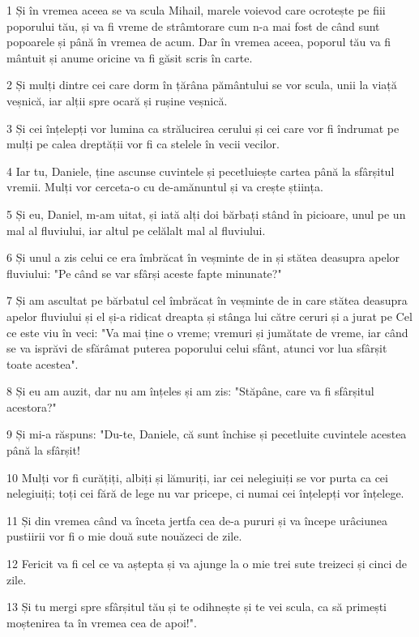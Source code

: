 \par 1 Și în vremea aceea se va scula Mihail, marele voievod care ocrotește pe fiii poporului tău, și va fi vreme de strâmtorare cum n-a mai fost de când sunt popoarele și până în vremea de acum. Dar în vremea aceea, poporul tău va fi mântuit și anume oricine va fi găsit scris în carte.
\par 2 Și mulți dintre cei care dorm în țărâna pământului se vor scula, unii la viață veșnică, iar alții spre ocară și rușine veșnică.
\par 3 Și cei înțelepți vor lumina ca strălucirea cerului și cei care vor fi îndrumat pe mulți pe calea dreptății vor fi ca stelele în vecii vecilor.
\par 4 Iar tu, Daniele, ține ascunse cuvintele și pecetluiește cartea până la sfârșitul vremii. Mulți vor cerceta-o cu de-amănuntul și va crește știința.
\par 5 Și eu, Daniel, m-am uitat, și iată alți doi bărbați stând în picioare, unul pe un mal al fluviului, iar altul pe celălalt mal al fluviului.
\par 6 Și unul a zis celui ce era îmbrăcat în veșminte de in și stătea deasupra apelor fluviului: "Pe când se var sfârși aceste fapte minunate?"
\par 7 Și am ascultat pe bărbatul cel îmbrăcat în veșminte de in care stătea deasupra apelor fluviului și el și-a ridicat dreapta și stânga lui către ceruri și a jurat pe Cel ce este viu în veci: "Va mai ține o vreme; vremuri și jumătate de vreme, iar când se va isprăvi de sfărâmat puterea poporului celui sfânt, atunci vor lua sfârșit toate acestea".
\par 8 Și eu am auzit, dar nu am înțeles și am zis: "Stăpâne, care va fi sfârșitul acestora?"
\par 9 Și mi-a răspuns: "Du-te, Daniele, că sunt închise și pecetluite cuvintele acestea până la sfârșit!
\par 10 Mulți vor fi curățiți, albiți și lămuriți, iar cei nelegiuiți se vor purta ca cei nelegiuiți; toți cei fără de lege nu var pricepe, ci numai cei înțelepți vor înțelege.
\par 11 Și din vremea când va înceta jertfa cea de-a pururi și va începe urâciunea pustiirii vor fi o mie două sute nouăzeci de zile.
\par 12 Fericit va fi cel ce va aștepta și va ajunge la o mie trei sute treizeci și cinci de zile.
\par 13 Și tu mergi spre sfârșitul tău și te odihnește și te vei scula, ca să primești moștenirea ta în vremea cea de apoi!".


